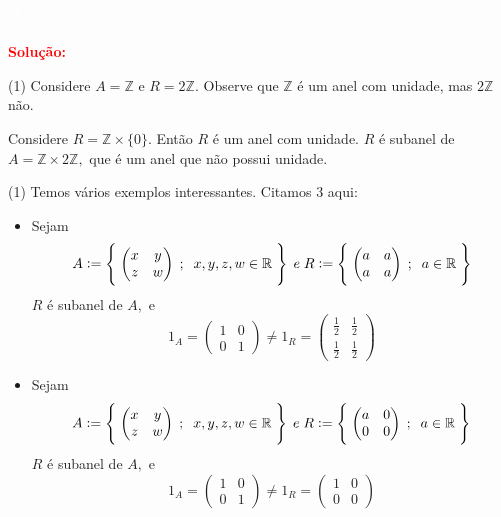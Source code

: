 \documentclass[11pt,a4paper]{article}
\newcommand{\dividiritens}[1]{\begin{tasks}[counter-format={(tsk[a])},label-width=3.6ex, label-format = {\bfseries}, column-sep = {0pt}](1) #1 \end{tasks}}
\newcommand{\pers}[1]{\textcolor{Floresta}{$\negrito{(#1)} $}}
\newcommand{\solucao}[1]{
\textbf{\textcolor{white}{oi}\\ \\ \textcolor{red}{Solução:}} #1}
\begin{document}
\solucao{
  \dividiritens{
\task[\pers{a}] Considere $A = \mathbb{Z}$ e $R = 2 \mathbb{Z}.$ Observe que $ \mathbb{Z}$ é um anel com unidade, mas $2 \mathbb{Z}$ não.

\task[\pers{b}] Considere $R = \mathbb{Z} \times \{ 0 \}.$ Então $R$ é um anel com unidade. $R$ é subanel de $A = \mathbb{Z} \times 2 \mathbb{Z},$ que é um anel que não possui unidade.
}
\dividiritens{
\task[\pers{c}] Temos vários exemplos interessantes. Citamos $3$ aqui:
\begin{itemize}
    \item Sejam
    \[
A:=\left\{\;\begin{pmatrix}x&y\\z&w\end{pmatrix}\;;\;\;x,y,z,w\in\Bbb R\;\right\}\; e \;R:=\left\{\;\begin{pmatrix}a&a\\a&a\end{pmatrix}\;;\;\;a\in\Bbb R\;\right\}
    \]
    $R$ é subanel de $A,$ e 
    \[
    1_A = \begin{pmatrix}1&0\\0&1\end{pmatrix} \neq 1_R = \begin{pmatrix}\frac{1}{2}&\frac{1}{2}\\\frac{1}{2}&\frac{1}{2}\end{pmatrix}
    \]
    \end{itemize}
    \begin{itemize}
        \item Sejam
    \[
A:=\left\{\;\begin{pmatrix}x&y\\z&w\end{pmatrix}\;;\;\;x,y,z,w\in\Bbb R\;\right\}\; e \;R:=\left\{\;\begin{pmatrix}a&0\\0&0\end{pmatrix}\;;\;\;a\in\Bbb R\;\right\}
    \]
    $R$ é subanel de $A,$ e 
    \[
    1_A = \begin{pmatrix}1&0\\0&1\end{pmatrix} \neq 1_R = \begin{pmatrix}1&0\\0&0\end{pmatrix}
    \]
    \end{itemize}

\task[\pers{d}]
}


}
\end{document}
